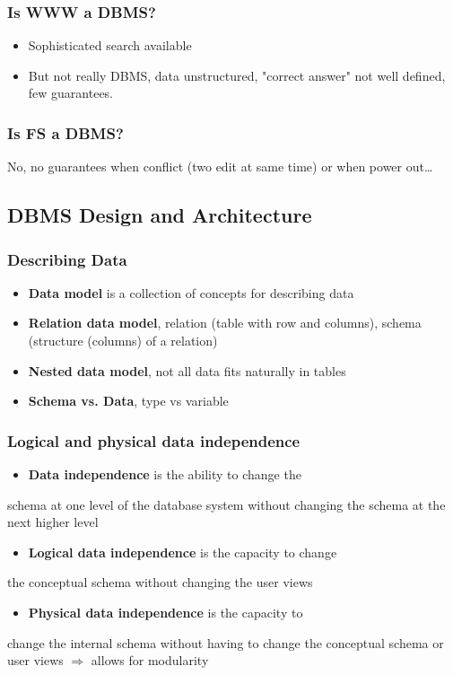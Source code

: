 \documentclass[11pt]{article}
\begin{document}
\subsubsection{Is WWW a DBMS?}
\label{sec:org6f52a92}
\begin{itemize}
\item Sophisticated search available
\item But not really DBMS, data unstructured, "correct answer" not well defined, few
guarantees.
\end{itemize}
\subsubsection{Is FS a DBMS?}
\label{sec:org1e6c8e3}
No, no guarantees when conflict (two edit at same time) or when power out\ldots{}
\subsection{DBMS Design and Architecture}
\label{sec:orgd0e6048}
\subsubsection{Describing Data}
\label{sec:org1d0702e}
\begin{itemize}
\item \textbf{Data model} is a collection of concepts for describing data
\item \textbf{Relation data model}, relation (table with row and columns), schema
(structure (columns) of a relation)
\item \textbf{Nested data model}, not all data fits naturally in tables
\item \textbf{Schema vs. Data}, type vs variable
\end{itemize}
\subsubsection{Logical and physical data independence}
\label{sec:org51f5da5}
\begin{itemize}
\item \textbf{Data independence} is the ability to change the
\end{itemize}
schema at one level of the database system without
changing the schema at the next higher level
\begin{itemize}
\item \textbf{Logical data independence} is the capacity to change
\end{itemize}
the conceptual schema without changing the user
views
\begin{itemize}
\item \textbf{Physical data independence} is the capacity to
\end{itemize}
change the internal schema without having to
change the conceptual schema or user views
\(\Rightarrow\) allows for modularity
\end{document}
